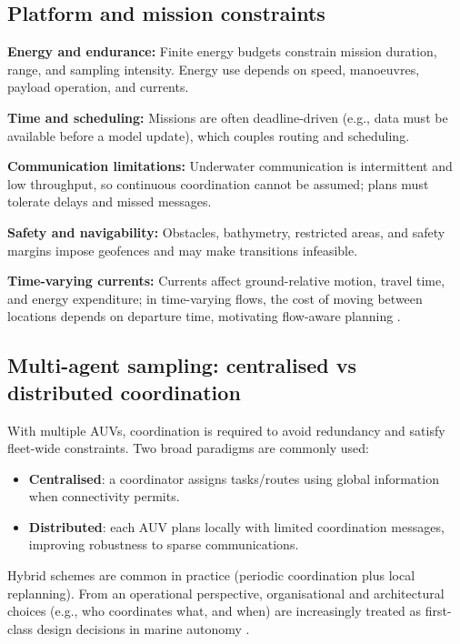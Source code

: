 \subsection{Platform and mission constraints}
\textbf{Energy and endurance:} Finite energy budgets constrain mission duration, range, and sampling intensity.
Energy use depends on speed, manoeuvres, payload operation, and currents.

\textbf{Time and scheduling:} Missions are often deadline-driven (e.g., data must be available before a model update),
which couples routing and scheduling.

\textbf{Communication limitations:} Underwater communication is intermittent and low throughput, so continuous coordination
cannot be assumed; plans must tolerate delays and missed messages.

\textbf{Safety and navigability:} Obstacles, bathymetry, restricted areas, and safety margins impose geofences and may make
transitions infeasible.

\textbf{Time-varying currents:} Currents affect ground-relative motion, travel time, and energy expenditure; in time-varying
flows, the cost of moving between locations depends on departure time, motivating flow-aware planning
\parencite{aguiar2018trajectoryopt}.

\subsection{Multi-agent sampling: centralised vs distributed coordination}
With multiple AUVs, coordination is required to avoid redundancy and satisfy fleet-wide constraints.
Two broad paradigms are commonly used:

\begin{itemize}
  \item \textbf{Centralised}: a coordinator assigns tasks/routes using global information when connectivity permits.
  \item \textbf{Distributed}: each AUV plans locally with limited coordination messages, improving robustness to sparse communications.
\end{itemize}

Hybrid schemes are common in practice (periodic coordination plus local replanning). From an operational perspective,
organisational and architectural choices (e.g., who coordinates what, and when) are increasingly treated as first-class
design decisions in marine autonomy \parencite{skaugset2025autonomousorg}.

